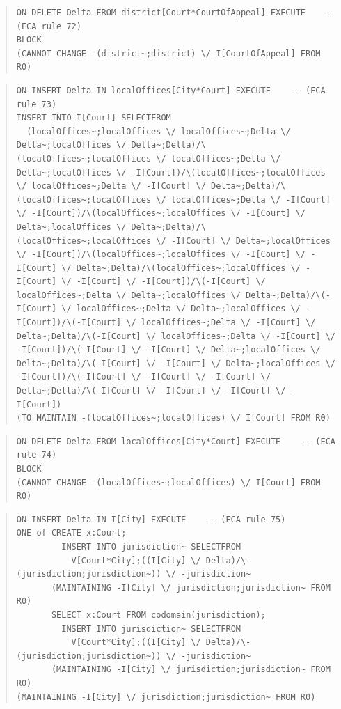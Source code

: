 \documentclass[10pt,a4paper]{report}              %
\theoremstyle{plain}\theorembodyfont{\rmfamily}\newtheorem{definition}{Definition}[section]
\theoremstyle{plain}\theorembodyfont{\rmfamily}\newtheorem{designrule}[definition]{Requirement}
\begin{document}
\begin{quote}
\begin{verbatim}
ON DELETE Delta FROM district[Court*CourtOfAppeal] EXECUTE    -- (ECA rule 72)
BLOCK
(CANNOT CHANGE -(district~;district) \/ I[CourtOfAppeal] FROM R0)
\end{verbatim}
\end{quote}
\begin{quote}
\begin{verbatim}
ON INSERT Delta IN localOffices[City*Court] EXECUTE    -- (ECA rule 73)
INSERT INTO I[Court] SELECTFROM
  (localOffices~;localOffices \/ localOffices~;Delta \/ Delta~;localOffices \/ Delta~;Delta)/\(localOffices~;localOffices \/ localOffices~;Delta \/ Delta~;localOffices \/ -I[Court])/\(localOffices~;localOffices \/ localOffices~;Delta \/ -I[Court] \/ Delta~;Delta)/\(localOffices~;localOffices \/ localOffices~;Delta \/ -I[Court] \/ -I[Court])/\(localOffices~;localOffices \/ -I[Court] \/ Delta~;localOffices \/ Delta~;Delta)/\(localOffices~;localOffices \/ -I[Court] \/ Delta~;localOffices \/ -I[Court])/\(localOffices~;localOffices \/ -I[Court] \/ -I[Court] \/ Delta~;Delta)/\(localOffices~;localOffices \/ -I[Court] \/ -I[Court] \/ -I[Court])/\(-I[Court] \/ localOffices~;Delta \/ Delta~;localOffices \/ Delta~;Delta)/\(-I[Court] \/ localOffices~;Delta \/ Delta~;localOffices \/ -I[Court])/\(-I[Court] \/ localOffices~;Delta \/ -I[Court] \/ Delta~;Delta)/\(-I[Court] \/ localOffices~;Delta \/ -I[Court] \/ -I[Court])/\(-I[Court] \/ -I[Court] \/ Delta~;localOffices \/ Delta~;Delta)/\(-I[Court] \/ -I[Court] \/ Delta~;localOffices \/ -I[Court])/\(-I[Court] \/ -I[Court] \/ -I[Court] \/ Delta~;Delta)/\(-I[Court] \/ -I[Court] \/ -I[Court] \/ -I[Court])
(TO MAINTAIN -(localOffices~;localOffices) \/ I[Court] FROM R0)
\end{verbatim}
\end{quote}
\begin{quote}
\begin{verbatim}
ON DELETE Delta FROM localOffices[City*Court] EXECUTE    -- (ECA rule 74)
BLOCK
(CANNOT CHANGE -(localOffices~;localOffices) \/ I[Court] FROM R0)
\end{verbatim}
\end{quote}
\begin{quote}
\begin{verbatim}
ON INSERT Delta IN I[City] EXECUTE    -- (ECA rule 75)
ONE of CREATE x:Court;
         INSERT INTO jurisdiction~ SELECTFROM
           V[Court*City];((I[City] \/ Delta)/\-(jurisdiction;jurisdiction~)) \/ -jurisdiction~
       (MAINTAINING -I[City] \/ jurisdiction;jurisdiction~ FROM R0)
       SELECT x:Court FROM codomain(jurisdiction);
         INSERT INTO jurisdiction~ SELECTFROM
           V[Court*City];((I[City] \/ Delta)/\-(jurisdiction;jurisdiction~)) \/ -jurisdiction~
       (MAINTAINING -I[City] \/ jurisdiction;jurisdiction~ FROM R0)
(MAINTAINING -I[City] \/ jurisdiction;jurisdiction~ FROM R0)
\end{verbatim}
\end{quote}
\end{document}
